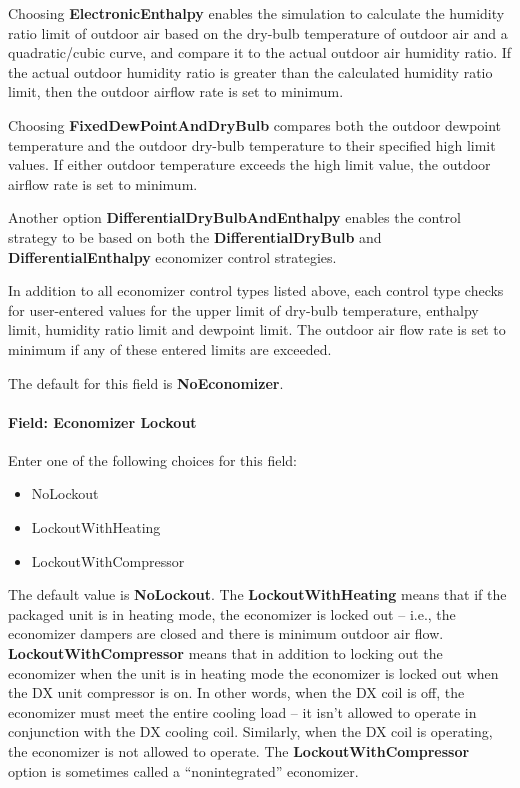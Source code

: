 Choosing \textbf{ElectronicEnthalpy} enables the simulation to calculate the humidity ratio limit of outdoor air based on the dry-bulb temperature of outdoor air and a quadratic/cubic curve, and compare it to the actual outdoor air humidity ratio. If the actual outdoor humidity ratio is greater than the calculated humidity ratio limit, then the outdoor airflow rate is set to minimum.

Choosing \textbf{FixedDewPointAndDryBulb} compares both the outdoor dewpoint temperature and the outdoor dry-bulb temperature to their specified high limit values. If either outdoor temperature exceeds the high limit value, the outdoor airflow rate is set to minimum.

Another option \textbf{DifferentialDryBulbAndEnthalpy} enables the control strategy to be based on both the \textbf{DifferentialDryBulb} and \textbf{DifferentialEnthalpy} economizer control strategies.

In addition to all economizer control types listed above, each control type checks for user-entered values for the upper limit of dry-bulb temperature, enthalpy limit, humidity ratio limit and dewpoint limit. The outdoor air flow rate is set to minimum if any of these entered limits are exceeded.

The default for this field is \textbf{NoEconomizer}.

\paragraph{Field: Economizer Lockout}\label{field-economizer-lockout-4}

Enter one of the following choices for this field:

\begin{itemize}
\item
  NoLockout
\item
  LockoutWithHeating
\item
  LockoutWithCompressor
\end{itemize}

The default value is \textbf{NoLockout}. The \textbf{LockoutWithHeating} means that if the packaged unit is in heating mode, the economizer is locked out -- i.e., the economizer dampers are closed and there is minimum outdoor air flow. \textbf{LockoutWithCompressor} means that in addition to locking out the economizer when the unit is in heating mode the economizer is locked out when the DX unit compressor is on. In other words, when the DX coil is off, the economizer must meet the entire cooling load -- it isn't allowed to operate in conjunction with the DX cooling coil. Similarly, when the DX coil is operating, the economizer is not allowed to operate. The \textbf{LockoutWithCompressor} option is sometimes called a ``nonintegrated'' economizer.

